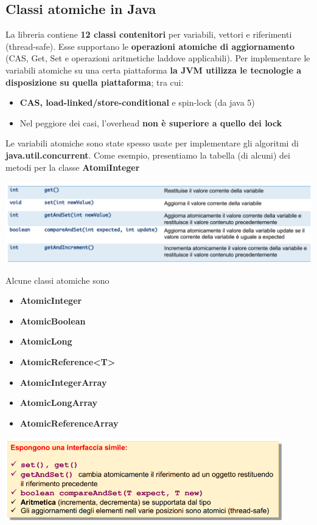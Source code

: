 \documentclass[12pt]{article}
\begin{document}
\subsection{Classi atomiche in Java}
La libreria contiene \textbf{12 classi contenitori} per variabili, vettori e riferimenti (thread-safe). Esse supportano le \textbf{operazioni atomiche di aggiornamento} (CAS, Get, Set e operazioni aritmetiche laddove applicabili). Per implementare le variabili atomiche su una certa piattaforma \textbf{la JVM utilizza le tecnologie a disposizione su quella piattaforma}; tra cui:
\begin{itemize}
    \item \textbf{CAS, load-linked/store-conditional} e spin-lock (da java 5)
    \item Nel peggiore dei casi, l'overhead \textbf{non è superiore a quello dei lock}
\end{itemize}
Le variabili atomiche sono state spesso usate per implementare gli algoritmi di \textbf{java.util.concurrent}. Come esempio, presentiamo la tabella (di alcuni) dei metodi per la classe \textbf{AtomiInteger}
\begin{center}
    \includegraphics[width = 1.10\textwidth]{Images/92.PNG}
\end{center}
Alcune classi atomiche sono
\begin{itemize}
    \item \textbf{AtomicInteger}
    \item \textbf{AtomicBoolean}
    \item \textbf{AtomicLong}
    \item \textbf{AtomicReference<T>}
    \item \textbf{AtomicIntegerArray}
    \item \textbf{AtomicLongArray}
    \item \textbf{AtomicReferenceArray}
\end{itemize}
\begin{center}
    \includegraphics[width = 0.90\textwidth]{Images/93.PNG}
\end{center}
\end{document}
